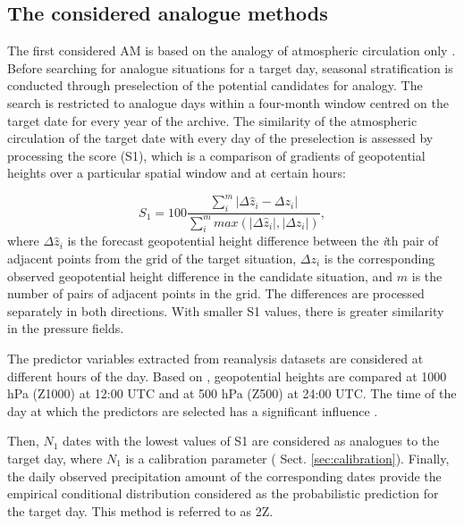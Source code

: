 \documentclass[hess, manuscript]{copernicus}
\begin{document}
	\subsection{The considered analogue methods}
	\label{sec:analog_method}
	
	The first considered AM is based on the analogy of atmospheric circulation only \citep[Table \ref{table:method_2Z};][]{Obled2002, Bontron2005}. Before searching for analogue situations for a target day, seasonal stratification is conducted through preselection of the potential candidates for analogy. The search is restricted to analogue days within a four-month window centred on the target date for every year of the archive. The similarity of the atmospheric circulation of the target date with every day of the preselection is assessed by processing the \citet{Teweles1954} score (S1), which is a comparison of gradients of geopotential heights over a particular spatial window and at certain hours:
	
	\begin{equation}
	\label{eq:S1}
	S_{1}=100 \frac {\displaystyle \sum_{i}^{m} \vert \Delta\hat{z}_{i} - \Delta z_{i} \vert}
	{\displaystyle \sum_{i}^{m} max( \vert \Delta\hat{z}_{i} \vert , \vert \Delta z_{i} \vert ) } ,
	\end{equation}
	where $\Delta \hat{z}_{i}$ is the forecast geopotential height difference between the \textit{i}th pair of adjacent points from the grid of the target situation, $\Delta z_{i}$ is the corresponding observed geopotential height difference in the candidate situation, and $m$ is the number of pairs of adjacent points in the grid. The differences are processed separately in both directions. With smaller S1 values, there is greater similarity in the pressure fields.
	
	The predictor variables extracted from reanalysis datasets are considered at different hours of the day. Based on \citet{Bontron2005}, geopotential heights are compared at 1000 hPa (Z1000) at 12:00 UTC and at 500 hPa (Z500) at 24:00 UTC. The time of the day at which the predictors are selected has a significant influence \citet{Bontron2004}.
	
	Then, $N_{1}$ dates with the lowest values of S1 are considered as analogues to the target day, where $N_{1}$ is a calibration parameter ( Sect. \ref{sec:calibration}). Finally, the daily observed precipitation amount of the corresponding dates provide the empirical conditional distribution considered as the probabilistic prediction for the target day. This method is referred to as 2Z.
	
\end{document}
